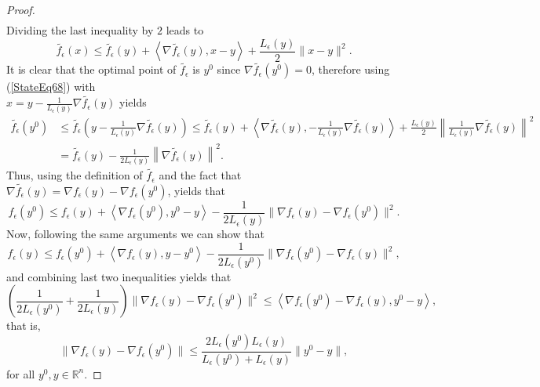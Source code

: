 \documentclass[11pt]{article}
\numberwithin{equation}{section}
\begin{document}
\begin{proof}
\begin{equation*}
\begin{aligned}
\end{aligned}
\end{equation*}
Dividing the last inequality by $2$ leads to
\begin{equation}
	\widetilde{f_{\epsilon}}(x) \leq \widetilde{f_{\epsilon}}(y) + \left\langle \nabla \widetilde{f_{\epsilon}}(y), x-y \right\rangle + \frac{L_{\epsilon}(y)}{2} \|x-y\|^2. \label{StateEq68}
\end{equation}
It is clear that the optimal point of $\widetilde{f_{\epsilon}}$ is $y^0$ since $\nabla \widetilde{f_{\epsilon}}(y^0) = 0$, therefore using (\ref{StateEq68}) with \\$x = y - \frac{1}{L_{\epsilon}(y)} \nabla \widetilde{f_{\epsilon}}(y)$ yields
\begin{equation*}
\begin{aligned}
	\widetilde{f_{\epsilon}}(y^0) &\leq \widetilde{f_{\epsilon}}\left( y - \frac{1}{L_{\epsilon}(y)} \nabla \widetilde{f_{\epsilon}}(y) \right) \leq \widetilde{f_{\epsilon}}(y) + \left\langle \nabla \widetilde{f_{\epsilon}}(y), - \frac{1}{L_{\epsilon}(y)} \nabla \widetilde{f_{\epsilon}}(y) \right\rangle + \frac{L_{\epsilon}(y)}{2} \left\lVert \frac{1}{L_{\epsilon}(y)} \nabla \widetilde{f_{\epsilon}}(y) \right\rVert ^2 \\
	&= \widetilde{f_{\epsilon}}(y) - \frac{1}{2 L_{\epsilon}(y)} \left\lVert \nabla \widetilde{f_{\epsilon}}(y) \right\rVert ^2.
\end{aligned}
\end{equation*}
Thus, using the definition of $\widetilde{f_{\epsilon}}$ and the fact that $\nabla \widetilde{f_{\epsilon}}(y) = \nabla f_{\epsilon}(y) - \nabla f_{\epsilon}(y^0)$, yields that
\begin{equation*}
	f_{\epsilon}(y^0) \leq f_{\epsilon}(y) + \left\langle \nabla f_{\epsilon}(y^0), y^0 - y \right\rangle - \frac{1}{2 L_{\epsilon}(y)} \| \nabla f_{\epsilon}(y) - \nabla f_{\epsilon}(y^0) \|^2 .
\end{equation*}
Now, following the same arguments we can show that
\begin{equation*}
	f_{\epsilon}(y) \leq f_{\epsilon}(y^0) + \left\langle \nabla f_{\epsilon}(y), y - y^0 \right\rangle - \frac{1}{2 L_{\epsilon}(y^0)} \| \nabla f_{\epsilon}(y^0) - \nabla f_{\epsilon}(y) \|^2 ,
\end{equation*}
and combining last two inequalities yields that
\begin{equation*}
	\left( \frac{1}{2 L_{\epsilon}(y^0)} + \frac{1}{2 L_{\epsilon}(y)} \right) \| \nabla f_{\epsilon}(y) - \nabla f_{\epsilon}(y^0) \|^2 \leq \left\langle \nabla f_{\epsilon}(y^0) - \nabla f_{\epsilon}(y), y^0 - y \right\rangle ,
\end{equation*}
that is, 
\begin{equation*}
	\| \nabla f_{\epsilon}(y) - \nabla f_{\epsilon}(y^0) \| \leq \frac{2L_{\epsilon}(y^0)L_{\epsilon}(y)}{L_{\epsilon}(y^0) + L_{\epsilon}(y)} \|y^0 - y\| ,
\end{equation*}
for all $y^0,y \in \mathbb{R}^n$.
\end{proof}
\end{document}

